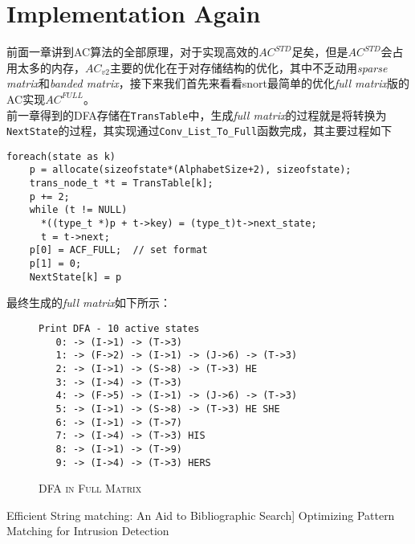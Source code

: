 \documentclass{article}
\begin{document}
\section{Implementation Again}
前面一章讲到AC算法的全部原理，对于实现高效的$AC^{STD}$足矣，但是$AC^{STD}$会占用太多的内存，$AC_{v2}$主要的优化在于对存储结构的优化，其中不乏动用\textit{sparse matrix}和\textit{banded matrix}，接下来我们首先来看看snort最简单的优化\textit{full matrix}版的AC实现$AC^{FULL}$。\\
前一章得到的DFA存储在\lstinline|TransTable|中，生成\textit{full matrix}的过程就是将转换为\lstinline|NextState|的过程，其实现通过\lstinline|Conv_List_To_Full|函数完成，其主要过程如下
\begin{lstlisting}
foreach(state as k)
    p = allocate(sizeofstate*(AlphabetSize+2), sizeofstate);
    trans_node_t *t = TransTable[k];
    p += 2;
    while (t != NULL)
      *((type_t *)p + t->key) = (type_t)t->next_state;
      t = t->next;
    p[0] = ACF_FULL;  // set format
    p[1] = 0;
    NextState[k] = p
\end{lstlisting}

最终生成的\textit{full matrix}如下所示：
\begin{figure}[h]
  \centering
\caption{\textsc{DFA in Full Matrix}}
\begin{verbatim}
Print DFA - 10 active states
   0: -> (I->1) -> (T->3)
   1: -> (F->2) -> (I->1) -> (J->6) -> (T->3)
   2: -> (I->1) -> (S->8) -> (T->3) HE
   3: -> (I->4) -> (T->3)
   4: -> (F->5) -> (I->1) -> (J->6) -> (T->3)
   5: -> (I->1) -> (S->8) -> (T->3) HE SHE
   6: -> (I->1) -> (T->7)
   7: -> (I->4) -> (T->3) HIS
   8: -> (I->1) -> (T->9)
   9: -> (I->4) -> (T->3) HERS
\end{verbatim}
\end{figure}


\begin{thebibliography}{99}
 Efficient String matching: An Aid to Bibliographic Search]
 Optimizing Pattern Matching for Intrusion Detection
\end{thebibliography}
\end{document}
